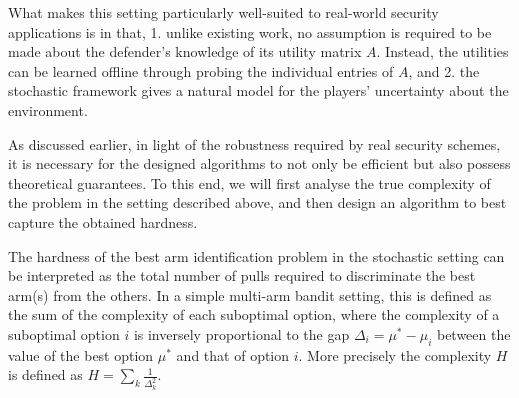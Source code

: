
What makes this setting particularly well-suited to real-world security applications is in that, 
1. unlike existing work, no assumption is required to be made about the defender's knowledge of its utility matrix $A$. Instead, the utilities can be learned offline through probing the individual entries of $A$, and 
2. the stochastic framework gives a natural model for the players' uncertainty about the environment.

As discussed earlier, in light of the robustness required by real security schemes, 
it is necessary for the designed algorithms to not only be efficient but also possess theoretical guarantees. 
To this end, we will first analyse the true complexity of the problem in the setting described above, 
and then design an algorithm to best capture the obtained hardness.   


The hardness of the best arm identification problem in the stochastic setting can be interpreted as the total number of pulls required to discriminate the best arm(s) from the others. In a simple multi-arm bandit setting, this is defined as the sum of the complexity of each suboptimal option, where the complexity of a suboptimal option $i$ is inversely proportional to the gap $\Delta_i= \mu^*- \mu_i$ between the value of the best option $\mu^*$ and that of option $i$.
More precisely the complexity $H$ is  defined as $H = \sum_{k} \frac{1}{\Delta_k^2}.$

